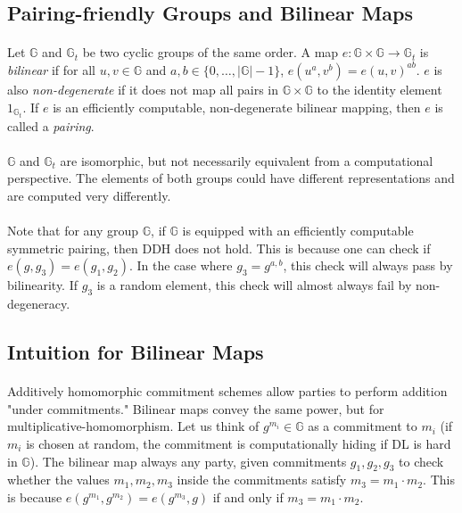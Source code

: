 \documentclass[11pt]{article}
\newcommand{\group}{\mathbb{G}}
\begin{document}
\subsection{Pairing-friendly Groups and Bilinear Maps}
\paragraph{} Let $\group$ and $\group_t$ be two cyclic groups of the same order. A map $e: \group \times \group \rightarrow \group_t$ is \textit{bilinear} if for all $u, v \in \group$ and $a, b \in \{0, \ldots, |\group| - 1\}$, $e(u^a, v^b) = e(u, v)^{ab}$. $e$ is also \textit{non-degenerate} if it does not map all pairs in $\group \times \group$ to the identity element $1_{\group_t}$. If $e$ is an efficiently computable, non-degenerate bilinear mapping, then $e$ is called a \textit{pairing}.

\paragraph{} $\group$ and $\group_t$ are isomorphic, but not necessarily equivalent from a computational perspective. The elements of both groups could have different representations and are computed very differently.

\paragraph{} Note that for any group $\group$, if $\group$ is equipped with an efficiently computable symmetric pairing, then DDH does not hold. This is because one can check if $e(g, g_3) = e(g_1, g_2)$. In the case where $g_3 = g^{a,b}$, this check will always pass by bilinearity. If $g_3$ is a random element, this check will almost always fail by non-degeneracy.

\subsection{Intuition for Bilinear Maps}
\paragraph{} Additively homomorphic commitment schemes allow parties to perform addition "under commitments." Bilinear maps convey the same power, but for multiplicative-homomorphism. Let us think of $g^{m_i} \in \group$ as a commitment to $m_i$ (if $m_i$ is chosen at random, the commitment is computationally hiding if DL is hard in $\group$). The bilinear map always any party, given commitments $g_1, g_2, g_3$ to check whether the values $m_1, m_2, m_3$ inside the commitments satisfy $m_3 = m_1 \cdot m_2$. This is because $e(g^{m_1}, g^{m_2}) = e(g^{m_3}, g)$ if and only if $m_3 = m_1 \cdot m_2$.
\end{document}
